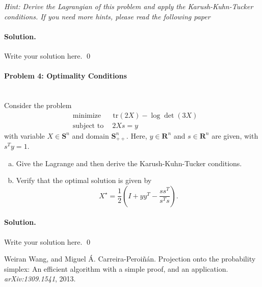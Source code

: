 \documentclass[a4paper]{article}
\newenvironment{solution}
{\color{blue} \paragraph{Solution.}}
{\newline \qed}
\begin{document}
\noindent\emph{Hint: Derive the Lagrangian of this problem and apply the Karush-Kuhn-Tucker conditions. If you need more hints, please read the following paper \cite{Wang2013}}
\begin{solution}
Write your solution here.
\end{solution}

\paragraph{Problem 4: Optimality Conditions}
~\\
Consider the problem
\begin{equation*}
    \begin{split}
        &\text{minimize~~} \quad  \text{tr}(2X) - \log{\det{(3X)}} \\
        &\text{subject to} \quad~  2Xs=y
    \end{split}
\end{equation*}
with variable $X \in \mathbf{S}^n$ and domain $\mathbf{S}_{++}^n$. Here, $y \in \mathbf{R}^n$ and $s \in \mathbf{R}^n$ are given, with $s^T y =1$.
\begin{enumerate}[a)]
    \item Give the Lagrange and then derive the Karush-Kuhn-Tucker conditions.
    \item Verify that the optimal solution is given by
    \begin{equation*}
        X^\star = \frac{1}{2} \left(I + yy^T - \frac{ss^T}{s^T s}\right) .
    \end{equation*}
\end{enumerate}

\begin{solution}
Write your solution here.
\end{solution}


\begin{thebibliography}{1}

Weiran Wang, and Miguel \'{A}. Carreira-Peroi\~{n}\'{a}n.
\newblock Projection onto the probability simplex: An efficient algorithm with a simple proof, and an application.
\newblock \emph{arXiv:1309.1541}, 2013.

\end{thebibliography}
\end{document}
